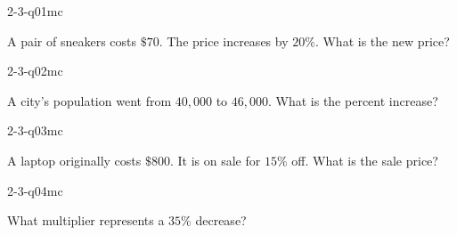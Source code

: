 

\begin{practiceQuestion}{2-3-q01}{mc}
\begin{questionText}
A pair of sneakers costs $\$70$. The price increases by $20\%$. What is the new price?
\end{questionText}
\end{practiceQuestion}

\begin{practiceQuestion}{2-3-q02}{mc}
\begin{questionText}
A city's population went from $40{,}000$ to $46{,}000$. What is the percent increase?
\end{questionText}
\end{practiceQuestion}

\begin{practiceQuestion}{2-3-q03}{mc}
\begin{questionText}
A laptop originally costs $\$800$. It is on sale for $15\%$ off. What is the sale price?
\end{questionText}
\end{practiceQuestion}

\begin{practiceQuestion}{2-3-q04}{mc}
\begin{questionText}
What multiplier represents a $35\%$ decrease?
\end{questionText}
\end{practiceQuestion}

